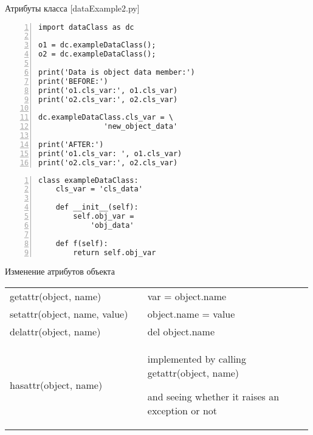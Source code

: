 \documentclass[hyperref={pdftex,unicode}]{beamer}
\begin{document}
\begin{frame}[fragile]{Атрибуты класса [dataExample2.py]}
\begin{minipage}{0.62\linewidth}
    \begin{lstlisting}[numbers=left,basicstyle=\scriptsize\ttfamily]
import dataClass as dc

o1 = dc.exampleDataClass();
o2 = dc.exampleDataClass();

print('Data is object data member:')
print('BEFORE:')
print('o1.cls_var:', o1.cls_var)
print('o2.cls_var:', o2.cls_var)

dc.exampleDataClass.cls_var = \
               'new_object_data'

print('AFTER:')
print('o1.cls_var: ', o1.cls_var)
print('o2.cls_var:', o2.cls_var)
    \end{lstlisting}
\end{minipage}
\hfill
\begin{minipage}{0.35\linewidth}
    \begin{lstlisting}[numbers=left,basicstyle=\tiny\ttfamily,numbers=none]
class exampleDataClass:
    cls_var = 'cls_data'

    def __init__(self):
        self.obj_var =
            'obj_data'

    def f(self):
        return self.obj_var
    \end{lstlisting}
\end{minipage}
\end{frame}

\begin{frame}[fragile]{Изменение атрибутов объекта}
\begin{center}
  \begin{tabular}[h!]{p{0.45\linewidth} p{0.54\linewidth}}
    getattr(object, name) & var = object.name \\
    setattr(object, name, value) & object.name = value \\
    delattr(object, name) & del object.name \\
    hasattr(object, name) & \scriptsize{
      implemented by calling getattr(object, name)

      and seeing whether it raises an exception or not} \\
  \end{tabular}
\end{center}
\end{frame}
\end{document}
